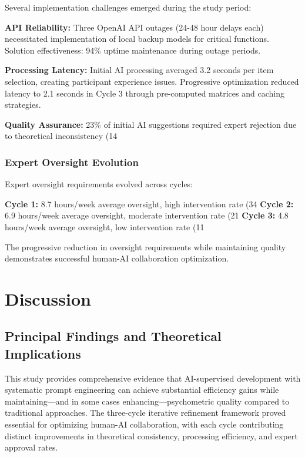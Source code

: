 \documentclass[12pt,a4paper]{article}
\begin{document}
Several implementation challenges emerged during the study period:

\textbf{API Reliability:} Three OpenAI API outages (24-48 hour delays each) necessitated implementation of local backup models for critical functions. Solution effectiveness: 94\% uptime maintenance during outage periods.

\textbf{Processing Latency:} Initial AI processing averaged 3.2 seconds per item selection, creating participant experience issues. Progressive optimization reduced latency to 2.1 seconds in Cycle 3 through pre-computed matrices and caching strategies.

\textbf{Quality Assurance:} 23\% of initial AI suggestions required expert rejection due to theoretical inconsistency (14%

\subsubsection{Expert Oversight Evolution}

Expert oversight requirements evolved across cycles:

\textbf{Cycle 1:} 8.7 hours/week average oversight, high intervention rate (34%
\textbf{Cycle 2:} 6.9 hours/week average oversight, moderate intervention rate (21%
\textbf{Cycle 3:} 4.8 hours/week average oversight, low intervention rate (11%

The progressive reduction in oversight requirements while maintaining quality demonstrates successful human-AI collaboration optimization.

\section{Discussion}

\subsection{Principal Findings and Theoretical Implications}

This study provides comprehensive evidence that AI-supervised development with systematic prompt engineering can achieve substantial efficiency gains while maintaining—and in some cases enhancing—psychometric quality compared to traditional approaches. The three-cycle iterative refinement framework proved essential for optimizing human-AI collaboration, with each cycle contributing distinct improvements in theoretical consistency, processing efficiency, and expert approval rates.
\end{document}
